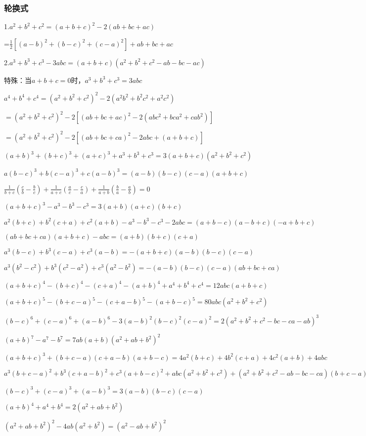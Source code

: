 \documentclass[UTF8]{ctexart}
\begin{document}
\subsubsection{轮换式}

1.$a^2+b^2+c^2=(a+b+c)^2-2(ab+bc+ac)$

=$\frac{1}{2}[(a-b)^2+(b-c)^2+(c-a)^2]+ab+bc+ac$

2.$a^3+b^3+c^3-3abc=(a+b+c)(a^2+b^2+c^2-ab-bc-ac)$

特殊：当$a+b+c=0$时，$a^3+b^3+c^3=3abc$

$a^4+b^4+c^4=(a^2+b^2+c^2)^2-2(a^2b^2+b^2c^2+a^2c^2)$

$=(a^2+b^2+c^2)^2-2[(ab+bc+ac)^2-2(abc^2+bca^2+cab^2)]$

$=(a^2+b^2+c^2)^2-2[(ab+bc+ca)^2-2abc+(a+b+c)]$

$(a+b)^3+(b+c)^3+(a+c)^3+a^3+b^3+c^3=3(a+b+c)(a^2+b^2+c^2)$

$a(b-c)^3+b(c-a)^3+c(a-b)^3=(a-b)(b-c)(c-a)(a+b+c)$

$\frac{1}{b+c}(\frac{c}{b}-\frac{b}{c})+\frac{1}{a+c}(\frac{a}{c}
-\frac{c}{a})+\frac{1}{a+b}(\frac{b}{a}-\frac{a}{b})=0$

$(a+b+c)^3-a^3-b^3-c^3=3(a+b)(a+c)(b+c)$

$a^2(b+c)+b^2(c+a)+c^2(a+b)-a^3-b^3-c^3-2abc=
(a+b-c)(a-b+c)(-a+b+c)$

$(ab+bc+ca)(a+b+c)-abc=(a+b)(b+c)(c+a)$

$a^3(b-c)+b^3(c-a)+c^3(a-b)=-(a+b+c)(a-b)(b-c)(c-a)$

$a^3(b^2-c^2)+b^3(c^2-a^2)+c^3(a^2-b^2)=
-(a-b)(b-c)(c-a)(ab+bc+ca)$

$(a+b+c)^4-(b+c)^4-(c+a)^4-(a+b)^4+a^4+b^4+c^4=
12abc(a+b+c)$

$(a+b+c)^5-(b+c-a)^5-(c+a-b)^5-(a+b-c)^5=
80abc(a^2+b^2+c^2)$

$(b-c)^6+(c-a)^6+(a-b)^6-3(a-b)^2(b-c)^2(c-a)^2
=2(a^2+b^2+c^2-bc-ca-ab)^3$

$(a+b)^7-a^7-b^7=7ab(a+b)(a^2+ab+b^2)^2$

$(a+b+c)^3+(b+c-a)(c+a-b)(a+b-c)=
4a^2(b+c)+4b^2(c+a)+4c^2(a+b)+4abc$

$a^3(b+c-a)^2+b^3(c+a-b)^2+c^3(a+b-c)^2+abc(a^2+b^2+c^2)+(a^2+b^2+c^2-ab-bc-ca)(b+c-a)(c+a-b)(a+b-c)=
2abc(ab+bc+ca)$

$(b-c)^3+(c-a)^3+(a-b)^3=3(a-b)(b-c)(c-a)$

$(a+b)^4+a^4+b^4=2(a^2+ab+b^2)$

$(a^2+ab+b^2)^2-4ab(a^2+b^2)=(a^2-ab+b^2)^2$
\end{document}
